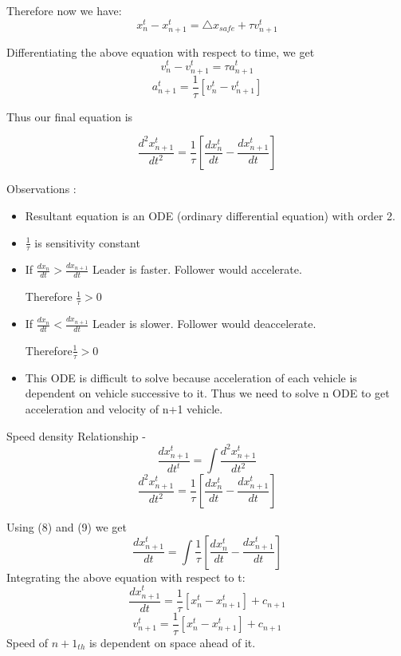 \documentclass[12pt, letterpaper]{article}
\begin{document}
 Therefore now we have:
 \begin{equation}
 x_n ^t - x_{n+1 } ^t = \triangle x_{safe} + \tau v_{n+1} ^t
 \end{equation}
 
 Differentiating the above equation with respect to time, we get
 \begin{equation}
 v_n ^t - v_{n+1 }^t = \tau a_{n+1 }^t
 \end{equation}
  \begin{equation}
 a_{n+1 }^t = \frac{1}{\tau} [v_n ^t - v_{n+1} ^t]
  \end{equation}
 
Thus our final equation is
 
 \begin{equation}
 \frac{d^2 x_{n+1} ^t}{dt^2} = \frac{1}{\tau} [\frac{d x_n ^t}{dt} - \frac{d x_{n+1} ^t}{dt}]
\end{equation}

Observations :

\begin{itemize}
\item Resultant equation is an ODE (ordinary differential equation) with order 2.
\item $\frac{1}{\tau} $ is sensitivity constant
\item If $\frac{d x_n}{dt} > \frac{d x_{n+1}}{dt}$
Leader is faster.
Follower would accelerate.

Therefore $\frac{1}{\tau} > 0$

\item If $\frac{d x_n}{dt} < \frac{d x_{n+1}}{dt}$
Leader is slower.
Follower would deaccelerate.

Therefore$ \frac{1}{\tau}  > 0$

\item This ODE is difficult to solve because acceleration of each vehicle is dependent on vehicle successive to it. Thus we need to solve n ODE to get acceleration and velocity of n+1 vehicle.
\end{itemize}

Speed density Relationship -
\begin{equation}
\frac{d x_{n+1} ^t}{dt ^t} = \int \frac{ d^2 x_{n+1} ^t}{dt^2}
\end{equation}
\begin{equation}
 \frac{d^2 x_{n+1} ^t}{dt^2} = \frac{1}{\tau} [\frac{d x_n ^t}{dt} - \frac{d x_{n+1} ^t}{dt}]
 \end{equation}
 
 Using (8) and (9)  we get
 \begin{equation}
 \frac{d x_{n+1} ^t}{dt} = \int \frac{1}{\tau} [\frac{d x_n ^t}{dt} - \frac{d x_{n+1} ^t}{dt}]
 \end{equation}
 Integrating the above equation with respect to t:
\begin{equation}
  \frac{d x_{n+1} ^t}{dt} =  \frac{1}{\tau}[  x_n ^t -  x_{n+1} ^t] + c_{n+1} 
  \end{equation}
 \begin{equation}
 v_{n+1} ^t =   \frac{1}{\tau}[  x_n ^t -  x_{n+1} ^t] + c_{n+1} 
  \end{equation}
  Speed of $n+1_{th}$ is dependent on space ahead of it.
\end{document}
